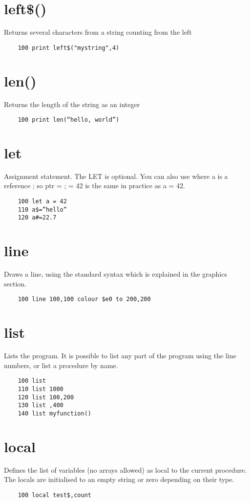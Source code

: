 \section*{left\$()}
Returns several characters from a string counting from the left
\example{}
\begin{verbatim}
	100 print left$("mystring",4)
\end{verbatim}

\section*{len()}
Returns the length of the string as an integer
\example{}
\begin{verbatim}
	100 print len(“hello, world”)
\end{verbatim}

\section*{let}
Assignment statement. The LET is optional. You can also use \@a where a is a reference ; so ptr = \@a ; \@ptr = 42 is the same in practice as a = 42.
\example{}
\begin{verbatim}
	100 let a = 42
	110 a$=”hello”
	120 a#=22.7
\end{verbatim}

\section*{line}
Draws a line, using the standard syntax which is explained in the graphics section.
\example{}
\begin{verbatim}
	100 line 100,100 colour $e0 to 200,200
\end{verbatim}

\section*{list}
Lists the program.  It is possible to list any part of the program using the line numbers, or list a procedure by name.
\example{}
\begin{verbatim}
	100 list
	110 list 1000
	120 list 100,200
	130 list ,400
	140 list myfunction()
\end{verbatim}

\section*{local}
Defines the list of variables (no arrays allowed) as local to the current procedure. The locals are initialised to an empty string or zero depending on their type. 
\example{}
\begin{verbatim}
	100 local test$,count
\end{verbatim}

